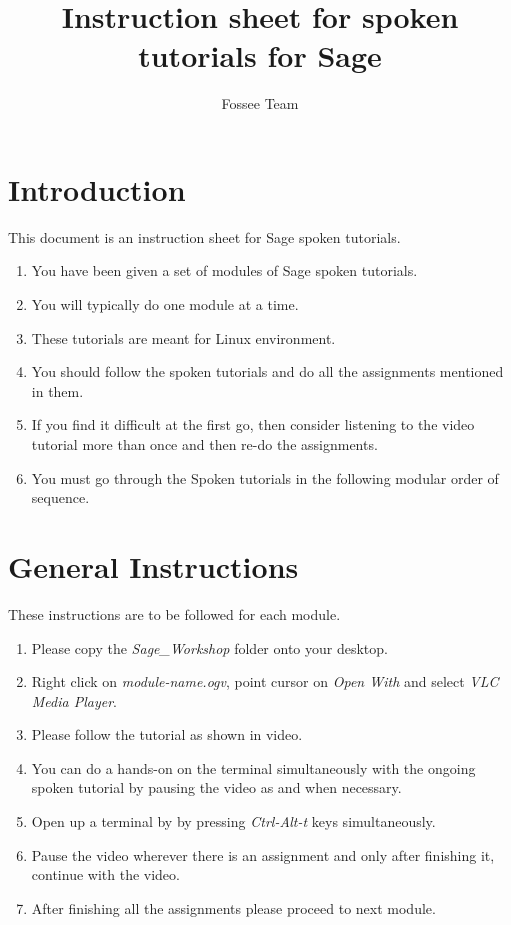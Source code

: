 \documentclass[11pt,twocolumn]{article}
\begin{document}
\title{Instruction sheet for spoken tutorials for Sage}
\author{Fossee Team}
\maketitle
\section*{Introduction }
{This document is an instruction sheet for Sage spoken tutorials.}
\setlength{\columnsep}{15pt }
\begin{enumerate}
  \item You have been given a set of modules of Sage spoken tutorials.
  \item You will typically do one module at a time.
  \item These tutorials are meant for Linux environment.
  \item You should follow the spoken tutorials and do all the assignments mentioned in them.
   \item If you find it difficult at the first go, then consider listening to the video tutorial more than once and then re-do the assignments.
   \item You must go through the Spoken tutorials in the following modular order of sequence. 
  

\end{enumerate}

\section*{General Instructions}
{These instructions are to be followed for each module.}
\setlength{\columnsep}{15pt }
\begin{enumerate}
	  
	
	\item Please copy the \emph{Sage\_Workshop} folder onto your desktop.
     \item Right click on \emph{module-name.ogv}, point cursor on \emph{Open With} and select \emph{VLC Media Player}.
  \item Please follow the tutorial as shown in video.
  \item You can do a hands-on on the terminal simultaneously with the ongoing spoken tutorial by pausing the video as and when necessary.
  \item Open up a terminal by by pressing \emph{Ctrl-Alt-t} keys simultaneously.
  \item Pause the video wherever there is an assignment and only after finishing it, continue with the video.
  \item After finishing all the assignments please proceed to next module. 

\end{enumerate}
\end{document}
